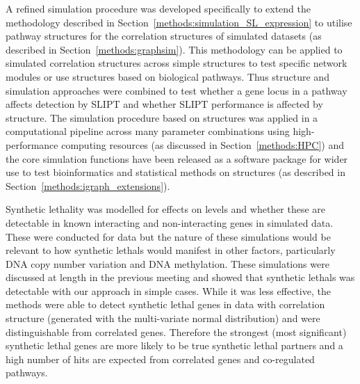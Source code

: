 A refined simulation procedure was developed specifically to extend the methodology described in Section~\ref{methods:simulation_SL_expression} to utilise pathway  structures for the correlation structures of simulated datasets (as described in Section~\ref{methods:graphsim}). This methodology can be applied to simulated correlation structures across simple  structures to test specific network modules or use  structures based on biological pathways. Thus  structure and simulation approaches were combined to test whether a gene locus in a pathway affects detection by \gls{SLIPT} and whether \gls{SLIPT} performance is affected by  structure. The simulation procedure based on  structures was applied in a computational pipeline across many parameter combinations using high-performance computing resources (as discussed in Section~\ref{methods:HPC}) and the core simulation functions have been released as a software package for wider use to test \gls{bioinformatics} and statistical methods on  structures (as described in Section~\ref{methods:igraph_extensions}).

\iffalse
Synthetic lethality was modelled for effects on  levels and whether these are detectable in known interacting and non-interacting genes in simulated data. These were conducted for  data but the nature of these simulations would be relevant to how \glspl{synthetic lethal} would manifest in other factors, particularly \acrshort{DNA} copy number variation and \acrshort{DNA} methylation. These simulations were discussed at length in the previous meeting and showed that \glspl{synthetic lethal} was detectable with our approach in simple cases. While it was less effective, the methods were able to detect \gls{synthetic lethal} genes in  data with correlation structure (generated with the multi-variate normal distribution) and were distinguishable from correlated genes. Therefore the strongest (most significant) \gls{synthetic lethal} genes are more likely to be true \gls{synthetic lethal} partners and a high number of hits are expected from correlated genes and co-regulated pathways.

